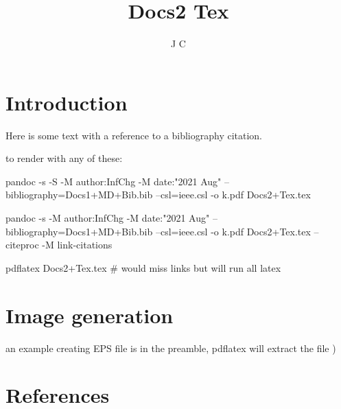 \documentclass{article}
\title{ Docs2 Tex }
\author{J C}
\begin{document}
\maketitle
\section{Introduction}
Here is some text with a reference to a bibliography citation.\cite{R-rmarkdown}

to render with any of these:

pandoc -s -S -M author:InfChg  -M date:"2021 Aug"   --bibliography=Docs1+MD+Bib.bib  --csl=ieee.csl  -o k.pdf   Docs2+Tex.tex  

pandoc -s  -M author:InfChg  -M date:"2021 Aug"   --bibliography=Docs1+MD+Bib.bib --csl=ieee.csl  -o k.pdf   Docs2+Tex.tex  --citeproc  -M link-citations 

pdflatex Docs2+Tex.tex  \# would miss links but will run all latex

\section{Image generation}

 an example creating EPS file is in the preamble,  pdflatex will extract the file )
 



\section{References}
\end{document}
